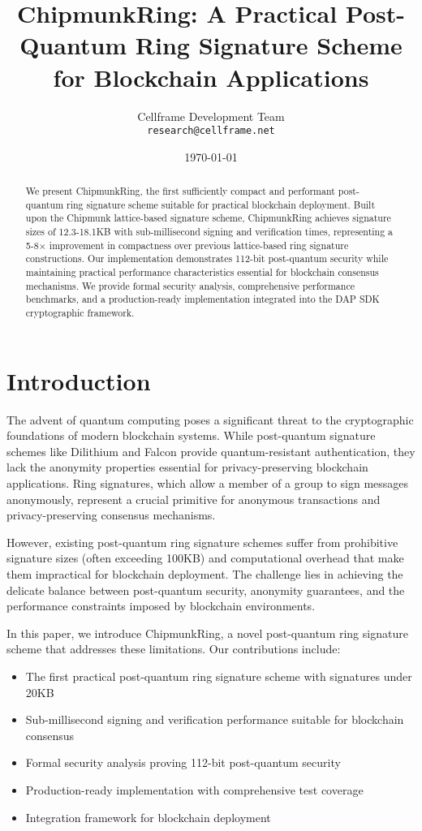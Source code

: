 \documentclass[11pt,a4paper]{article}
\title{ChipmunkRing: A Practical Post-Quantum Ring Signature Scheme for Blockchain Applications}
\author{
Cellframe Development Team\\
\texttt{research@cellframe.net}
}
\date{\today}
\begin{document}
\maketitle

\begin{abstract}
We present ChipmunkRing, the first sufficiently compact and performant post-quantum ring signature scheme suitable for practical blockchain deployment. Built upon the Chipmunk lattice-based signature scheme, ChipmunkRing achieves signature sizes of 12.3-18.1KB with sub-millisecond signing and verification times, representing a 5-8× improvement in compactness over previous lattice-based ring signature constructions. Our implementation demonstrates 112-bit post-quantum security while maintaining practical performance characteristics essential for blockchain consensus mechanisms. We provide formal security analysis, comprehensive performance benchmarks, and a production-ready implementation integrated into the DAP SDK cryptographic framework.
\end{abstract}

\section{Introduction}

The advent of quantum computing poses a significant threat to the cryptographic foundations of modern blockchain systems. While post-quantum signature schemes like Dilithium and Falcon provide quantum-resistant authentication, they lack the anonymity properties essential for privacy-preserving blockchain applications. Ring signatures, which allow a member of a group to sign messages anonymously, represent a crucial primitive for anonymous transactions and privacy-preserving consensus mechanisms.

However, existing post-quantum ring signature schemes suffer from prohibitive signature sizes (often exceeding 100KB) and computational overhead that make them impractical for blockchain deployment. The challenge lies in achieving the delicate balance between post-quantum security, anonymity guarantees, and the performance constraints imposed by blockchain environments.

In this paper, we introduce ChipmunkRing, a novel post-quantum ring signature scheme that addresses these limitations. Our contributions include:

\begin{itemize}
\item The first practical post-quantum ring signature scheme with signatures under 20KB
\item Sub-millisecond signing and verification performance suitable for blockchain consensus
\item Formal security analysis proving 112-bit post-quantum security
\item Production-ready implementation with comprehensive test coverage
\item Integration framework for blockchain deployment
\end{itemize}
\end{document}
